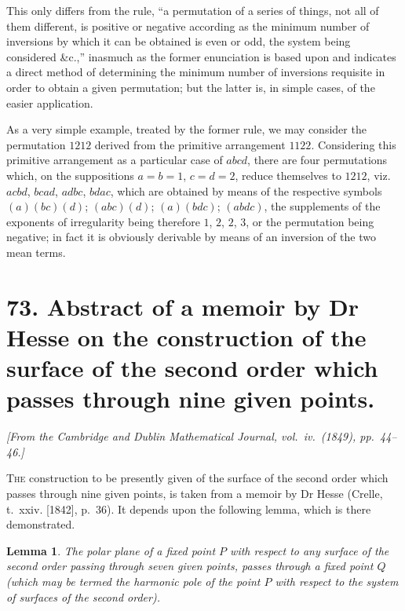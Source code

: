 \documentclass[11pt,a4paper]{book}
\newtheorem*{lemma}{Lemma}
\begin{document}
This only differs from the rule, ``a permutation of a series of things, not all of them different, is positive or negative according as the minimum number of inversions by which it can be obtained is even or odd, the system being considered \&c.,'' inasmuch as the former enunciation is based upon and indicates a direct method of determining the minimum number of inversions requisite in order to obtain a given permutation; but the latter is, in simple cases, of the easier application.

As a very simple example, treated by the former rule, we may consider the permutation $1212$ derived from the primitive arrangement $1122$. Considering this primitive arrangement as a particular case of $abcd$, there are four permutations which, on the suppositions $a = b = 1$, $c = d = 2$, reduce themselves to $1212$, viz.\ $acbd$, $bcad$, $adbc$, $bdac$, which are obtained by means of the respective symbols $(a)(bc)(d)$; $(abc)(d)$; $(a)(bdc)$; $(abdc)$, the supplements of the exponents of irregularity being therefore $1$, $2$, $2$, $3$, or the permutation being negative; in fact it is obviously derivable by means of an inversion of the two mean terms.



\newpage
\section*{73. Abstract of a memoir by Dr Hesse on the construction of the surface of the second order which passes through nine given points.}

\begin{flushright}
\textit{[From the Cambridge and Dublin Mathematical Journal, vol.\ iv.\ (1849), pp.\ 44--46.]}
\end{flushright}

\setcounter{page}{425}

\textsc{The} construction to be presently given of the surface of the second order which passes through nine given points, is taken from a memoir by Dr Hesse (Crelle, t.~xxiv. [1842], p.~36). It depends upon the following lemma, which is there demonstrated.

\begin{lemma}
The polar plane of a fixed point $P$ with respect to any surface of the second order passing through seven given points, passes through a fixed point $Q$ (which may be termed the harmonic pole of the point $P$ with respect to the system of surfaces of the second order).
\end{lemma}
\end{document}
